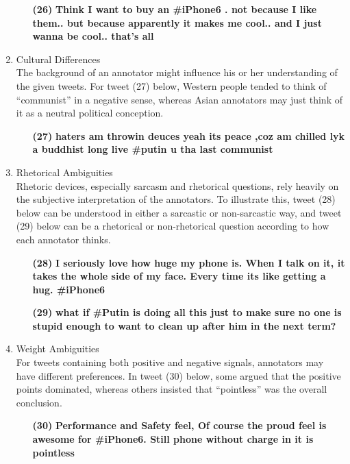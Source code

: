 \documentclass[english]{jnlp_1.4}
\begin{document}
\begin{enumerate}
\begin{enumerate}
\item[{\bf (26)}] {\bf Think I want to buy an \#iPhone6 . not because I like them.. but because apparently it makes me cool.. and I just wanna be cool.. that's all}
\end{enumerate}
\item Cultural Differences\\
The background of an annotator might influence his or her understanding of the given tweets. For tweet (27) below, Western people tended to think of ``communist'' in a negative sense, whereas Asian annotators may just think of it as a neutral political conception.
\begin{enumerate}
\item[{\bf (27)}] {\bf haters am throwin deuces yeah its peace ,coz am chilled lyk a buddhist long live \#putin u tha last communist}
\end{enumerate}
\item Rhetorical Ambiguities\\
Rhetoric devices, especially sarcasm and rhetorical questions, rely heavily on the subjective interpretation of the annotators. To illustrate this, tweet (28) below can be understood in either a sarcastic or non-sarcastic way, and tweet (29) below can be a rhetorical or non-rhetorical question according to how each annotator thinks.
\begin{enumerate}
\item[{\bf (28)}] {\bf I seriously love how huge my phone is. When I talk on it, it takes the whole side of my face. Every time its like getting a hug. \#iPhone6}
\end{enumerate}
\begin{enumerate}
\item[{\bf (29)}] {\bf what if \#Putin is doing all this just to make sure no one is stupid enough to want to clean up after him in the next term?}
\end{enumerate}
\item Weight Ambiguities\\
For tweets containing both positive and negative signals, annotators may have different preferences. In tweet (30) below, some argued that the positive points dominated, whereas others insisted that ``pointless'' was the overall conclusion.
\begin{enumerate}
\item[{\bf (30)}] {\bf Performance and Safety feel, Of course the proud feel is awesome for \#iPhone6. Still phone without charge in it is pointless}
\end{enumerate}
\end{enumerate}
\end{document}
